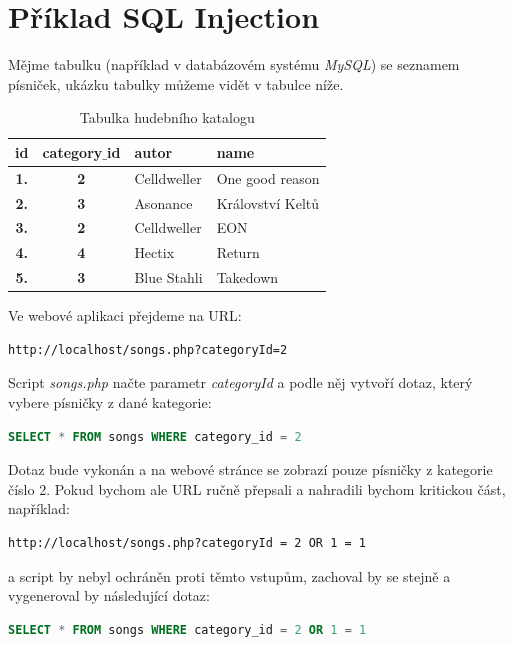 \documentclass[12pt, a4paper]{report}
\begin{document}
\section{Příklad SQL Injection}
Mějme tabulku (například v databázovém systému \textit{MySQL}) se seznamem písniček, ukázku tabulky můžeme vidět v tabulce níže.
\begin{table}[!h]
\centering
\begin{tabular}{|c|c|l|l|}
\hline
\bf id & \bf category$\_$id & \bf autor & \bf name \\
\hline
\hline
\bf 1. & \bf 2 & Celldweller & One good reason \\
\hline
\bf 2. & \bf 3 & Asonance & Království Keltů \\
\hline
\bf 3. & \bf 2 & Celldweller & EON \\
\hline
\bf 4. & \bf 4 & Hectix & Return \\
\hline
\bf 5. & \bf 3 & Blue Stahli & Takedown\\
\hline
\end{tabular}
\label{tab:hac}
\caption{Tabulka hudebního katalogu}
\end{table}
\newline
Ve webové aplikaci přejdeme na URL:
\begin{lstlisting}[label=web_app_url_1,language=HTML, caption=URL webové aplikace]
http://localhost/songs.php?categoryId=2
\end{lstlisting}

Script \textit{songs.php} načte parametr \textit{categoryId} a podle něj vytvoří dotaz, který vybere písničky z dané kategorie:

\begin{lstlisting}[label=web_app_url_2,language=SQL, caption=Vytvořený SQL dotaz]
SELECT * FROM songs WHERE category_id = 2
\end{lstlisting}

Dotaz bude vykonán a na webové stránce se zobrazí pouze písničky z kategorie číslo 2. Pokud bychom ale URL ručně přepsali a nahradili bychom kritickou část, například:
\begin{lstlisting}[label=web_app_url_3,language=HTML, caption=Ručně upravené URL]
http://localhost/songs.php?categoryId = 2 OR 1 = 1
\end{lstlisting}

a script by nebyl ochráněn proti těmto  vstupům, zachoval by se stejně a vygeneroval by následující dotaz:
\begin{lstlisting}[label=web_app_url_4,language=SQL, caption=Vygenerovaný SQL dotaz z upraveného URL]
SELECT * FROM songs WHERE category_id = 2 OR 1 = 1
\end{lstlisting}
\end{document}
